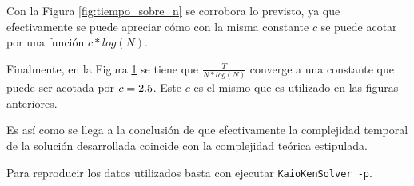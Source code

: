 	Con la Figura \ref{fig:tiempo_sobre_n} se corrobora lo previsto, ya que
	efectivamente se puede apreciar cómo con la misma constante $c$ se puede
	acotar por una función $c*log(N)$.

	\begin{figure}[H]
		\centering
		\caption{}
		\label{fig:tiempo_sobre_n_log_n}
	\end{figure}

	Finalmente, en la Figura \ref{fig:tiempo_sobre_n_log_n} se tiene que
	$\frac{T}{N*log(N)}$ converge a una constante que puede ser acotada por $c =
	2.5$. Este $c$ es el mismo que es utilizado en las figuras
	anteriores.

	Es así como se llega a la conclusión de que efectivamente la complejidad
	temporal de la solución desarrollada coincide con la complejidad teórica estipulada.

	Para reproducir los datos utilizados basta con ejecutar \texttt{KaioKenSolver
	-p}.
